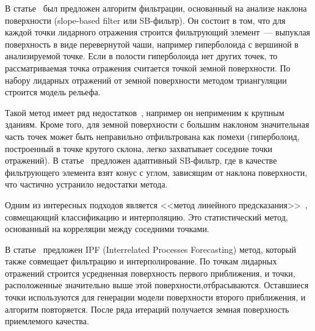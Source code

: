 \begin{multicols}{2}
   В статье~\cite{9su} был предложен алгоритм фильтрации, основанный на 
анализе наклона поверхности (slope-based filter или SB-фильтр). Он состоит в 
том, что для каждой точки лидарного отражения строится фильтрующий 
элемент~--- выпуклая поверхность в виде перевернутой чаши, например 
гиперболоида с вершиной в анализируемой точке. Если в полости гиперболоида 
нет других точек, то рассматриваемая точка отражения считается точкой 
земной поверхности. По набору лидарных отражений от земной поверхности 
методом триангуляции строится модель рельефа.
   
   Такой метод имеет ряд недостатков~\cite{10su}, например он неприменим к 
крупным зданиям. Кроме того, для земной поверхности с большим наклоном 
значительная часть точек может быть неправильно отфильтрована как помехи 
(гиперболоид, построенный в точке крутого склона, легко захватывает соседние 
точки отражений). В статье~\cite{10su} предложен адаптивный SB-фильтр, где 
в качестве фильт\-ру\-юще\-го элемента взят конус с углом, зависящим от наклона 
поверхности, что частично устранило недостатки метода.

   Одним из интересных подходов является <<метод линейного 
предсказания>>~\cite{11su}, совмещающий классификацию и интерполяцию. 
Это статистический метод, основанный на корреляции между соседними 
точками.
   
В статье~\cite{12su} предложен IPF (Interrelated Proc\-esses Forecasting)
метод, который также совмещает\linebreak 
фильтрацию и интерполирование. По точкам лидарных отражений строится 
усредненная по\-верх\-ность первого приближения, и точки, расположенные 
значительно выше этой по\-верх\-ности,\linebreak отбрасываются. Оставшиеся точки 
используются для генерации модели поверхности второго приближения, и 
алгоритм повторяется. После ряда итераций получается земная поверхность 
приемлемого качества.
   

\end{multicols}
